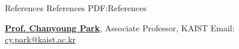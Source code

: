 \documentclass[letterpaper,MMMyyyy,nonstopmode]{simpleresumecv}
\begin{document}
\begin{Body}


\Section
{References}
{References}
{PDF:References}

\BulletItem
\href{http://dsail.kaist.ac.kr/professor/}
{\textbf{Prof. Chanyoung Park}}, Associate Professor, KAIST
\newline
Email: \href{mailto:cy.park@kaist.ac.kr}{cy.park@kaist.ac.kr}











\end{Body}
\end{document}
